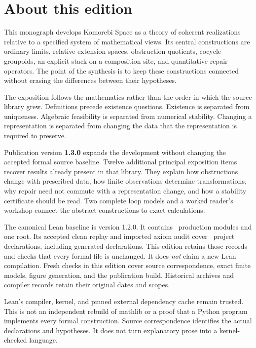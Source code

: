 \documentclass[11pt]{article}
\begin{document}
\KomorebiCover
{}
\section*{About this edition}
This monograph develops Komorebi Space as a theory of coherent realizations relative to a specified system of mathematical views. Its central constructions are ordinary limits, relative extension spaces, obstruction quotients, cocycle groupoids, an explicit stack on a composition site, and quantitative repair operators. The point of the synthesis is to keep these constructions connected without erasing the differences between their hypotheses.

The exposition follows the mathematics rather than the order in which the source library grew. Definitions precede existence questions. Existence is separated from uniqueness. Algebraic feasibility is separated from numerical stability. Changing a representation is separated from changing the data that the representation is required to preserve.

Publication version \textbf{1.3.0} expands the development without changing the accepted formal source baseline. Twelve additional principal exposition items recover results already present in that library. They explain how obstructions change with prescribed data, how finite observations determine transformations, why repair need not commute with a representation change, and how a stability certificate should be read. Two complete loop models and a worked reader's workshop connect the abstract constructions to exact calculations.

The canonical Lean baseline is version 1.2.0. It contains \EditionFormalModules\ production modules and one root. Its accepted clean replay and imported axiom audit cover \EditionAuditedDeclarations\ project declarations, including generated declarations. This edition retains those records and checks that every formal file is unchanged. It does \emph{not} claim a new Lean compilation. Fresh checks in this edition cover source correspondence, exact finite models, figure generation, and the publication build. Historical archives and compiler records retain their original dates and scopes.

Lean's compiler, kernel, and pinned external dependency cache remain trusted. This is not an independent rebuild of mathlib or a proof that a Python program implements every formal construction. Source correspondence identifies the actual declarations and hypotheses. It does not turn explanatory prose into a kernel-checked language.
\end{document}
